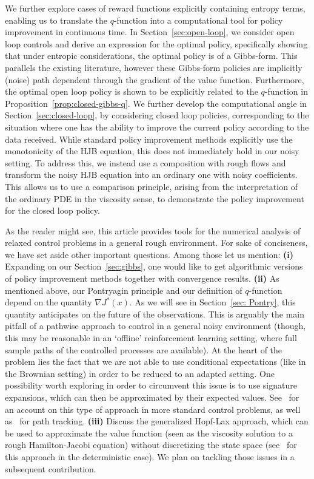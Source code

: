 \documentclass[12pt,reqno]{amsart}
\numberwithin{equation}{section}  %
\newcommand{\1}{{\bf 1}}
\newcommand{\2}{{\bf 2}}
\theoremstyle{remark}
\theoremstyle{remark}
\begin{document}
We further explore cases of reward functions explicitly containing entropy terms, enabling us to translate the $q$-function into a computational tool for policy improvement in continuous time. In Section~\ref{sec:open-loop}, we consider open loop controls and derive an expression for the optimal policy, specifically showing that under entropic considerations, the optimal policy is of a Gibbs-form. This parallels the existing literature, however these Gibbs-form policies are implicitly (noise) path dependent through the gradient of the value function. Furthermore, the optimal open loop policy is shown to be explicitly related to the $q$-function in Proposition~\ref{prop:closed-gibbs-q}. We further develop the computational angle in Section~\ref{sec:closed-loop}, by considering closed loop policies, corresponding to the situation where one has the ability to improve the current policy according to the data received. While standard policy improvement methods explicitly use the monotonicity of the HJB equation, this does not immediately hold in our noisy setting. To address this, we instead use a composition with rough flows and transform the noisy HJB equation into an ordinary one with noisy coefficients. This allows us to use a comparison principle, arising from the interpretation of the ordinary PDE in the viscosity sense, to demonstrate the policy improvement for the closed loop policy.

As the reader might see, this article provides tools for the numerical analysis of relaxed control problems in a general rough environment. For sake of conciseness, we have set aside other important questions. Among those let us mention: 
\textbf{(i)} Expanding on our Section~\ref{sec:gibbs}, one would like to get algorithmic versions of policy improvement methods together with convergence results. 
\textbf{(ii)}  As mentioned above, our Pontryagin principle and our definition of $q$-function depend on the quantity $\nabla J^*(x)$. As we will see in Section~\ref{sec: Pontry}, this quantity anticipates on the future of the observations. This is arguably the main pitfall of a pathwise approach to control in a general noisy environment (though, this may be reasonable in an `offline' reinforcement learning setting, where full sample paths of the controlled processes are available). At the heart of the problem lies the fact that  we are not able to use conditional expectations (like in the Brownian setting) in order to be reduced to an adapted setting. One possibility worth exploring in order to circumvent this issue is to use signature expansions, which can then be approximated by their expected values. See~\cite{BBHRN,FS-al} for an account on this type of approach in more standard control problems, as well as~\cite{OAI-al} for path tracking.
\textbf{(iii)} Discuss the generalized Hopf-Lax approach, which can be used to approximate the value function (seen as the viscosity solution to a rough Hamilton-Jacobi equation) without discretizing the state space (see~\cite{KY} for this approach in the deterministic case).
We plan on tackling those issues in a subsequent contribution.
\end{document}
